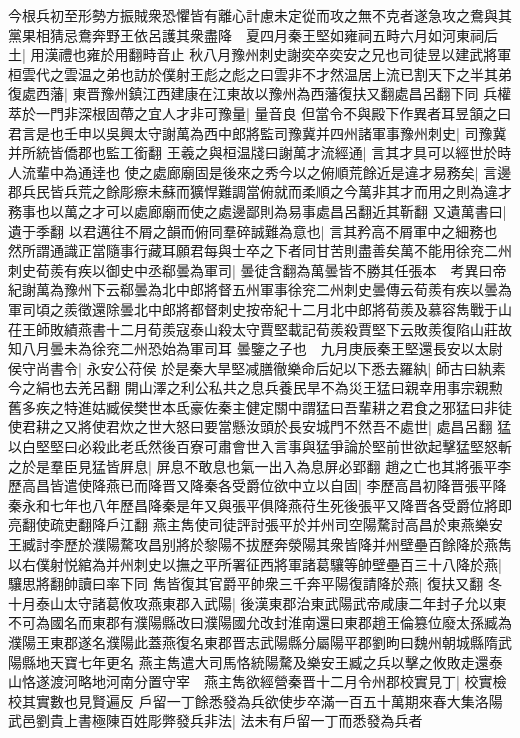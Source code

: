 今根兵初至形勢方振賊衆恐懼皆有離心計慮未定從而攻之無不克者遂急攻之鴦與其黨果相猜忌鴦奔野王依呂護其衆盡降　夏四月秦王堅如雍祠五畤六月如河東祠后土|{
	用漢禮也雍於用翻畤音止}
秋八月豫州刺史謝奕卒奕安之兄也司徒昱以建武將軍桓雲代之雲温之弟也訪於僕射王彪之彪之曰雲非不才然温居上流已割天下之半其弟復處西藩|{
	東晋豫州鎮江西建康在江東故以豫州為西藩復扶又翻處昌呂翻下同}
兵權萃於一門非深根固蔕之宜人才非可豫量|{
	量音良}
但當令不與殿下作異者耳昱頷之曰君言是也壬申以吳興太守謝萬為西中郎將監司豫冀并四州諸軍事豫州刺史|{
	司豫冀并所統皆僑郡也監工銜翻}
王羲之與桓温牋曰謝萬才流經通|{
	言其才具可以經世於時人流輩中為通逹也}
使之處廊廟固是後來之秀今以之俯順荒餘近是違才易務矣|{
	言邊郡兵民皆兵荒之餘彫瘵未蘇而獷悍難調當俯就而柔順之今萬非其才而用之則為違才務事也以萬之才可以處廊廟而使之處邊鄙則為易事處昌呂翻近其靳翻}
又遺萬書曰|{
	遺于季翻}
以君邁往不屑之韻而俯同羣碎誠難為意也|{
	言其矜高不屑軍中之細務也}
然所謂通識正當隨事行藏耳願君每與士卒之下者同甘苦則盡善矣萬不能用徐兖二州刺史荀羨有疾以御史中丞郗曇為軍司|{
	曇徒含翻為萬曇皆不勝其任張本　考異曰帝紀謝萬為豫州下云郗曇為北中郎將督五州軍事徐兖二州刺史曇傳云荀羨有疾以曇為軍司頃之羨徵還除曇北中郎將都督刺史按帝紀十二月北中郎將荀羨及慕容雋戰于山茌王師敗績燕書十二月荀羨寇泰山殺太守賈堅載記荀羨殺賈堅下云敗羨復陷山莊故知八月曇未為徐兖二州恐始為軍司耳}
曇鑒之子也　九月庚辰秦王堅還長安以太尉侯守尚書令|{
	永安公苻侯}
於是秦大旱堅减膳徹樂命后妃以下悉去羅紈|{
	師古曰紈素今之絹也去羌呂翻}
開山澤之利公私共之息兵養民旱不為災王猛曰親幸用事宗親勲舊多疾之特進姑臧侯樊世本氐豪佐秦主健定關中謂猛曰吾輩耕之君食之邪猛曰非徒使君耕之又將使君炊之世大怒曰要當懸汝頭於長安城門不然吾不處世|{
	處昌呂翻}
猛以白堅堅曰必殺此老氐然後百寮可肅會世入言事與猛爭論於堅前世欲起擊猛堅怒斬之於是羣臣見猛皆屛息|{
	屏息不敢息也氣一出入為息屏必郢翻}
趙之亡也其將張平李歷高昌皆遣使降燕已而降晋又降秦各受爵位欲中立以自固|{
	李歷高昌初降晋張平降秦永和七年也八年歷昌降秦是年又與張平俱降燕苻生死後張平又降晋各受爵位將即亮翻使疏吏翻降戶江翻}
燕主雋使司徒評討張平於并州司空陽騖討高昌於東燕樂安王臧討李歷於濮陽騖攻昌别將於黎陽不拔歷奔滎陽其衆皆降并州壁壘百餘降於燕雋以右僕射悦綰為并州刺史以撫之平所署征西將軍諸葛驤等帥壁壘百三十八降於燕|{
	驤思將翻帥讀曰率下同}
雋皆復其官爵平帥衆三千奔平陽復請降於燕|{
	復扶又翻}
冬十月泰山太守諸葛攸攻燕東郡入武陽|{
	後漢東郡治東武陽武帝咸康二年封子允以東不可為國名而東郡有濮陽縣改曰濮陽國允改封淮南還曰東郡趙王倫篡位廢太孫臧為濮陽王東郡遂名濮陽此蓋燕復名東郡晋志武陽縣分屬陽平郡劉昫曰魏州朝城縣隋武陽縣地天寶七年更名}
燕主雋遣大司馬恪統陽騖及樂安王臧之兵以擊之攸敗走還泰山恪遂渡河略地河南分置守宰　燕主雋欲經營秦晋十二月令州郡校實見丁|{
	校實檢校其實數也見賢遍反}
戶留一丁餘悉發為兵欲使步卒滿一百五十萬期來春大集洛陽武邑劉貴上書極陳百姓彫弊發兵非法|{
	法未有戶留一丁而悉發為兵者}
